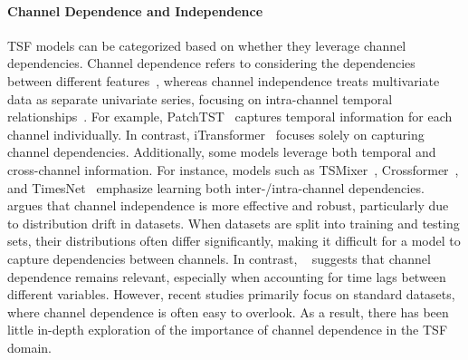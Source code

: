 \paragraph{\textbf{Channel Dependence and Independence}}
\label{sec:CDI}
TSF models can be categorized based on whether they leverage channel dependencies. Channel dependence refers to considering the dependencies between different features~\cite{chen23TSMixer}, whereas channel independence treats multivariate data as separate univariate series, focusing on intra-channel temporal relationships~\cite{nie23}.
For example, PatchTST~\cite{nie23} captures temporal information for each channel individually.
In contrast, iTransformer~\cite{liu24} focuses solely on capturing channel dependencies. Additionally, some models leverage both temporal and cross-channel information.
For instance, models such as TSMixer~\cite{chen23}, Crossformer~\cite{zhang23}, and TimesNet~\cite{timesnet} emphasize learning both inter-/intra-channel dependencies.
\cite{ci_distri} argues that channel independence is more effective and robust, particularly due to distribution drift in datasets. When datasets are split into training and testing sets, their distributions often differ significantly, making it difficult for a model to capture dependencies between channels.
In contrast, ~\cite{cd_rethinking} suggests that channel dependence remains relevant, especially when accounting for time lags between different variables.
However, recent studies primarily focus on standard datasets, where channel dependence is often easy to overlook. As a result, there has been little in-depth exploration of the importance of channel dependence in the TSF domain.